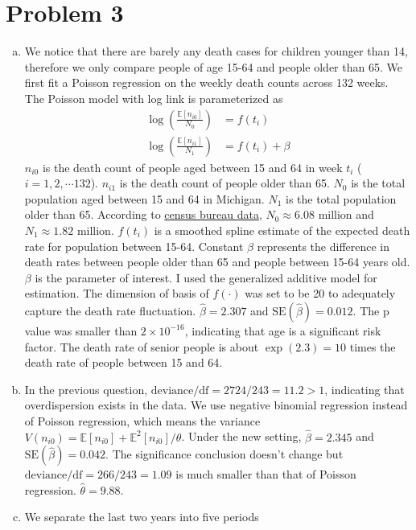 \documentclass[12pt]{article}
\begin{document}
\section*{Problem 3}

\begin{enumerate}[(a)]
	\item We notice that there are barely any death cases for children younger than 14, therefore we only compare people of age 15-64 and people older than 65. We first fit a Poisson regression on the weekly death counts across 132 weeks. The Poisson model with log link is parameterized as
	\begin{align*}
		\log(\frac{\mathbb{E}[n_{i0}]}{N_{0}}) &= f(t_{i})\\
		\log(\frac{\mathbb{E}[n_{i1}]}{N_{1}}) &= f(t_{i})+\beta
	\end{align*}
	$n_{i0}$ is the death count of people aged between 15 and 64 in week $t_{i}$ ($i=1,2,\cdots 132$). $n_{i1}$ is the death count of people older than 65. $N_{0}$ is the total population aged between 15 and 64 in Michigan. $N_{1}$ is the total population older than 65. According to \href{https://www.census.gov/quickfacts/MI}{census bureau data}, $N_{0}\approx 6.08$ million and $N_{1}\approx 1.82$ million. $f(t_{i})$ is a smoothed spline estimate of the expected death rate for population between 15-64. Constant $\beta$ represents the difference in death rates between people older than 65 and people between 15-64 years old. $\beta$ is the parameter of interest. I used the generalized additive model for estimation. The dimension of basis of $f(\cdot)$ was set to be 20 to adequately capture the death rate fluctuation. $\hat{\beta} = 2.307$ and $\text{SE}(\hat{\beta}) = 0.012$. The p value was smaller than $2\times 10^{-16}$, indicating that age is a significant risk factor. The death rate of senior people is about $\exp(2.3) = 10$ times the death rate of people between 15 and 64. 
	\item In the previous question, $\text{deviance}/\text{df}=2724/243=11.2 > 1$, indicating that overdispersion exists in the data. We use negative binomial regression instead of Poisson regression, which means the variance $V(n_{i0}) = \mathbb{E}[n_{i0}] +\mathbb{E}^{2}[n_{i0}]/\theta$. Under the new setting, $\hat{\beta} = 2.345$ and  $\text{SE}(\hat{\beta}) = 0.042$. The significance conclusion doesn't change but $\text{deviance}/\text{df}=266/243=1.09$ is much smaller than that of Poisson regression. $\hat{\theta}=9.88$.
	
	\item We separate the last two years into five periods
\end{enumerate}
\end{document}
